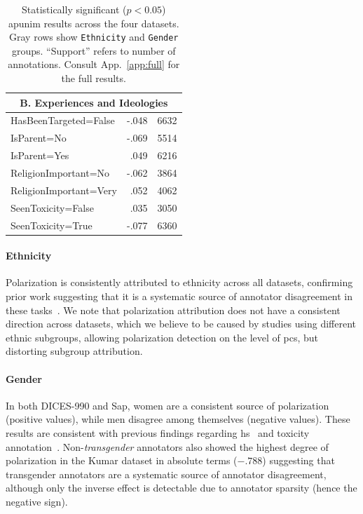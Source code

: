 \documentclass[11pt]{article}
\theoremstyle{definition}
\theoremstyle{plain}
\begin{document}
\begin{table}[t]
\begin{tabularx}{\columnwidth}{X r r}
		\midrule
		\multicolumn{3}{c}{B. Experiences and Ideologies} \\
		\midrule 
		HasBeenTargeted=False & -.048 & 6632 \\
		IsParent=No & -.069 & 5514 \\
		IsParent=Yes & .049 & 6216 \\
		ReligionImportant=No & -.062 & 3864 \\
		ReligionImportant=Very & .052 & 4062 \\
		SeenToxicity=False & .035 & 3050 \\
		SeenToxicity=True & -.077 & 6360 \\
		
		
		\bottomrule
	\end{tabularx}
	\caption{Statistically significant ($p<0.05$) apunim results across the four datasets. Gray rows show \texttt{Ethnicity} and \texttt{Gender} groups. ``Support'' refers to number of annotations. Consult App.~\ref{app:full} for the full results.}
	\label{tab:merged-apunim}
\end{table}

\paragraph{Ethnicity} Polarization is consistently attributed to ethnicity across all datasets, confirming prior work suggesting that it is a systematic source of annotator disagreement in these tasks~\cite{goyal2022your}. We note that polarization attribution does not have a consistent direction across datasets, which we believe to be caused by studies using different ethnic subgroups, allowing polarization detection on the level of \acp{pc}, but distorting subgroup attribution.

\paragraph{Gender} In both DICES-990 and Sap, women are a consistent source of polarization (positive values), while men disagree among themselves (negative values). These results are consistent with previous findings regarding \ac{hs}~\citep{wojatzki2018women} and toxicity annotation~\cite{binns2017like}. Non-\emph{transgender} annotators also showed the highest degree of polarization in the Kumar dataset in absolute terms ($-.788$) suggesting that transgender annotators are a systematic source of annotator disagreement, although only the inverse effect is detectable due to annotator sparsity (hence the negative sign).
\end{document}
